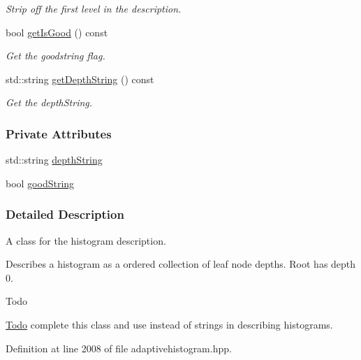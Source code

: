 \begin{DoxyCompactItemize}
\begin{DoxyCompactList}\small\item\em \-Strip off the first level in the description. \end{DoxyCompactList}\item 
bool \hyperlink{classsubpavings_1_1HistDescription_a4c48acd03fc56cb6e8b3d2645ee35c31}{get\-Is\-Good} () const 
\begin{DoxyCompactList}\small\item\em \-Get the goodstring flag. \end{DoxyCompactList}\item 
std\-::string \hyperlink{classsubpavings_1_1HistDescription_a35a0b15e904f1987b6603c7ffeb22f75}{get\-Depth\-String} () const 
\begin{DoxyCompactList}\small\item\em \-Get the depth\-String. \end{DoxyCompactList}\end{DoxyCompactItemize}
\subsubsection*{\-Private \-Attributes}
\begin{DoxyCompactItemize}
\item 
std\-::string \hyperlink{classsubpavings_1_1HistDescription_a05dabb27d7e43834ac9a8a99d8237538}{depth\-String}
\item 
bool \hyperlink{classsubpavings_1_1HistDescription_a3f246c1b82fb69929ec3761480c934b9}{good\-String}
\end{DoxyCompactItemize}


\subsubsection{\-Detailed \-Description}
\-A class for the histogram description. 

\-Describes a histogram as a ordered collection of leaf node depths. \-Root has depth 0.

\begin{DoxyRefDesc}{\-Todo}
\item[\hyperlink{todo__todo000001}{\-Todo}]complete this class and use instead of strings in describing histograms.\end{DoxyRefDesc}


\-Definition at line 2008 of file adaptivehistogram.\-hpp.



